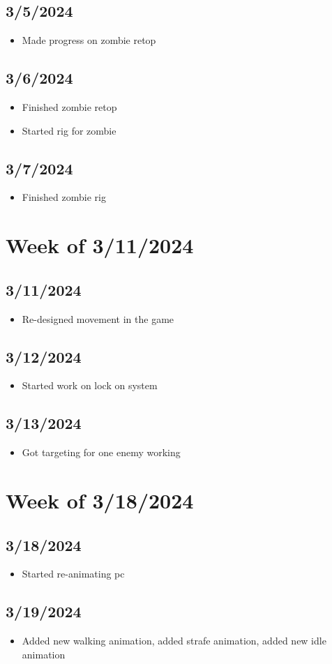 \documentclass{article}
\begin{document}
\subsection*{3/5/2024}
\begin{itemize}
   \item Made progress on zombie retop
\end{itemize}
\subsection*{3/6/2024}
\begin{itemize}
   \item Finished zombie retop
   \item Started rig for zombie
\end{itemize}
\subsection*{3/7/2024}
\begin{itemize}
   \item Finished zombie rig
\end{itemize}

\section*{Week of 3/11/2024}
\subsection*{3/11/2024}
\begin{itemize}
   \item Re-designed movement in the game
\end{itemize}
\subsection*{3/12/2024}
\begin{itemize}
   \item Started work on lock on system
\end{itemize}
\subsection*{3/13/2024}
\begin{itemize}
   \item Got targeting for one enemy working
\end{itemize}

\section*{Week of 3/18/2024}
\subsection*{3/18/2024}
\begin{itemize}
   \item Started re-animating pc
\end{itemize}
\subsection*{3/19/2024}
\begin{itemize}
   \item Added new walking animation, added strafe animation, added new idle animation
\end{itemize}
\end{document}
